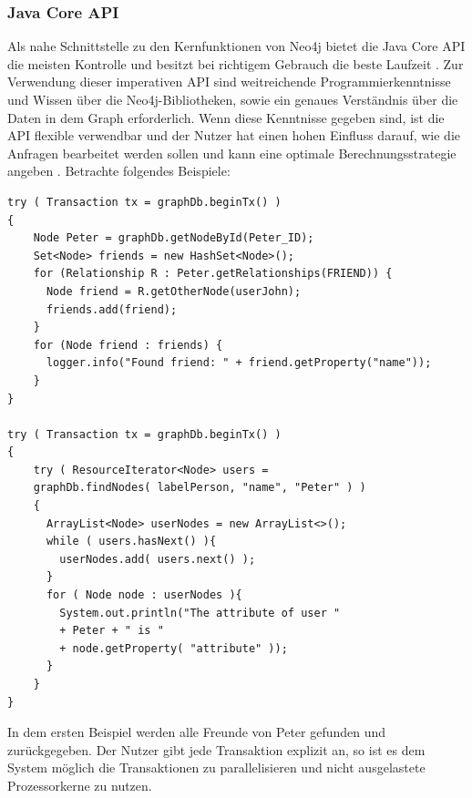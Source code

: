 \subsubsection{Java Core API}
Als nahe Schnittstelle zu den Kernfunktionen von Neo4j bietet die Java Core API die meisten Kontrolle und besitzt bei richtigem Gebrauch die beste Laufzeit \parencite{vukotic2015neo4j}. Zur Verwendung dieser imperativen API sind weitreichende Programmierkenntnisse und Wissen über die Neo4j-Bibliotheken, sowie ein genaues Verständnis  über die Daten in dem Graph erforderlich. Wenn diese Kenntnisse gegeben sind, ist die API flexible verwendbar  und der Nutzer hat einen hohen Einfluss darauf, wie die Anfragen bearbeitet werden sollen und kann eine optimale Berechnungsstrategie angeben \parencite{vukotic2015neo4j}. Betrachte folgendes Beispiele: \newline
\begin{Verbatim}[frame=single]
try ( Transaction tx = graphDb.beginTx() )
{
	Node Peter = graphDb.getNodeById(Peter_ID);
	Set<Node> friends = new HashSet<Node>();
	for (Relationship R : Peter.getRelationships(FRIEND)) {  
	  Node friend = R.getOtherNode(userJohn);
	  friends.add(friend);                        
	}
	for (Node friend : friends) {
	  logger.info("Found friend: " + friend.getProperty("name")); 
	}
}

try ( Transaction tx = graphDb.beginTx() )
{
	try ( ResourceIterator<Node> users =
	graphDb.findNodes( labelPerson, "name", "Peter" ) )
	{
	  ArrayList<Node> userNodes = new ArrayList<>();
	  while ( users.hasNext() ){
		userNodes.add( users.next() );
	  }
	  for ( Node node : userNodes ){
		System.out.println("The attribute of user " 
		+ Peter + " is " 
		+ node.getProperty( "attribute" ));
	  }
	}
}
\end{Verbatim}

In dem ersten Beispiel werden alle Freunde von Peter gefunden und zurückgegeben. Der Nutzer gibt jede Transaktion explizit an, so ist es dem System möglich die Transaktionen zu parallelisieren und nicht ausgelastete Prozessorkerne zu nutzen.

